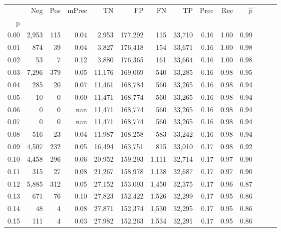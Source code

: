 \begin{tabular}{rrrrrrrrrrrrrr}
\toprule
{} &     Neg &    Pos & mPrec &       TN &       FP &      FN &      TP &  Prec &   Rec & $\hat{p}$ \\
p    &         &        &       &          &          &         &         &       &       &           \\
\midrule
0.00 &   2,953 &    115 &  0.04 &    2,953 &  177,292 &     115 &  33,710 &  0.16 &  1.00 &      0.99 \\
0.01 &     874 &     39 &  0.04 &    3,827 &  176,418 &     154 &  33,671 &  0.16 &  1.00 &      0.98 \\
0.02 &      53 &      7 &  0.12 &    3,880 &  176,365 &     161 &  33,664 &  0.16 &  1.00 &      0.98 \\
0.03 &   7,296 &    379 &  0.05 &   11,176 &  169,069 &     540 &  33,285 &  0.16 &  0.98 &      0.95 \\
0.04 &     285 &     20 &  0.07 &   11,461 &  168,784 &     560 &  33,265 &  0.16 &  0.98 &      0.94 \\
0.05 &      10 &      0 &  0.00 &   11,471 &  168,774 &     560 &  33,265 &  0.16 &  0.98 &      0.94 \\
0.06 &       0 &      0 &   nan &   11,471 &  168,774 &     560 &  33,265 &  0.16 &  0.98 &      0.94 \\
0.07 &       0 &      0 &   nan &   11,471 &  168,774 &     560 &  33,265 &  0.16 &  0.98 &      0.94 \\
0.08 &     516 &     23 &  0.04 &   11,987 &  168,258 &     583 &  33,242 &  0.16 &  0.98 &      0.94 \\
0.09 &   4,507 &    232 &  0.05 &   16,494 &  163,751 &     815 &  33,010 &  0.17 &  0.98 &      0.92 \\
0.10 &   4,458 &    296 &  0.06 &   20,952 &  159,293 &   1,111 &  32,714 &  0.17 &  0.97 &      0.90 \\
0.11 &     315 &     27 &  0.08 &   21,267 &  158,978 &   1,138 &  32,687 &  0.17 &  0.97 &      0.90 \\
0.12 &   5,885 &    312 &  0.05 &   27,152 &  153,093 &   1,450 &  32,375 &  0.17 &  0.96 &      0.87 \\
0.13 &     671 &     76 &  0.10 &   27,823 &  152,422 &   1,526 &  32,299 &  0.17 &  0.95 &      0.86 \\
0.14 &      48 &      4 &  0.08 &   27,871 &  152,374 &   1,530 &  32,295 &  0.17 &  0.95 &      0.86 \\
0.15 &     111 &      4 &  0.03 &   27,982 &  152,263 &   1,534 &  32,291 &  0.17 &  0.95 &      0.86 \\

\end{tabular}
